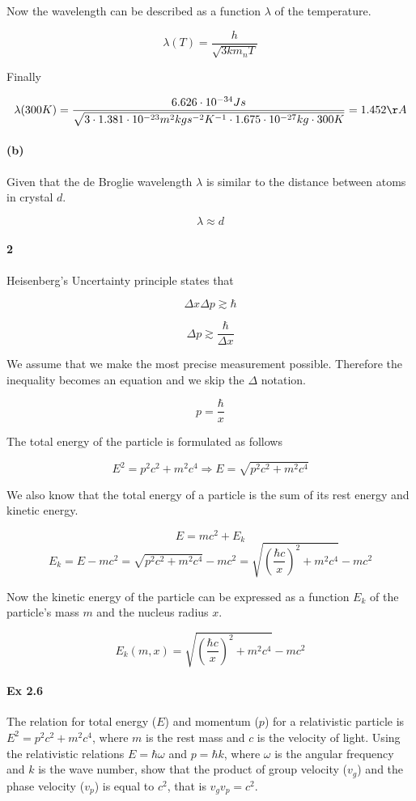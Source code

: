 \documentclass{article}
\begin{document}
Now the wavelength can be described as a function $\lambda$ of the temperature.

\[\lambda(T) = \frac{h}{\sqrt{3km_{n}T}}\]

Finally

\[\lambda(300K) = \frac{6.626 \cdot 10^{-34} Js}{\sqrt{3 \cdot 1.381 \cdot 10^{-23} m^{2}kgs^{-2}K^{-1} \cdot 1.675 \cdot 10^{-27} kg \cdot 300K}} = 1.452 \AA\]

\paragraph{(b)}

Given that the de Broglie wavelength $\lambda$ is similar to the distance between atoms in crystal $d$.

\[\lambda \approx d\]

\paragraph{2}

Heisenberg's Uncertainty principle states that

\[\Delta x \Delta p \gtrsim \hbar\]

\[ \Delta p \gtrsim \frac{\hbar}{\Delta x} \]

We assume that we make the most precise measurement possible. Therefore the inequality becomes an equation and we skip the $\Delta$ notation.

\[ p = \frac{\hbar}{x} \]

The total energy of the particle is formulated as follows

\[ E^2 = p^2c^2 + m^2c^4 \Rightarrow E = \sqrt{p^2c^2 + m^2c^4} \]

We also know that  the total energy of a particle is the sum of its rest energy and kinetic energy.

\[ E = mc^2 + E_k \] 
\[ E_k = E - mc^2 = \sqrt{p^2c^2 + m^2c^4} - mc^2 = \sqrt{\left( \frac{\hbar c}{x} \right)^2 + m^2c^4} - mc^2 \]

Now the kinetic energy of the particle can be expressed as a function $E_k$ of the particle's mass $m$ and the nucleus radius $x$.

\[ E_k(m, x) = \sqrt{\left( \frac{\hbar c}{x} \right)^2 + m^2c^4} - mc^2 \]


\paragraph{Ex 2.6}
The relation for total energy ($E$) and momentum ($p$) for a relativistic particle is $E^2 = p^2c^2 + m^2c^4$, where $m$ is the rest mass and $c$ is the velocity of light. Using the relativistic relations $E = \hbar \omega$ and $p = \hbar k$, where $\omega$ is the angular frequency and $k$ is the wave number, show that the product of group velocity ($v_g$) and the phase velocity ($v_p$) is equal to $c^2$, that is $v_g v_p = c^2$.
\end{document}
